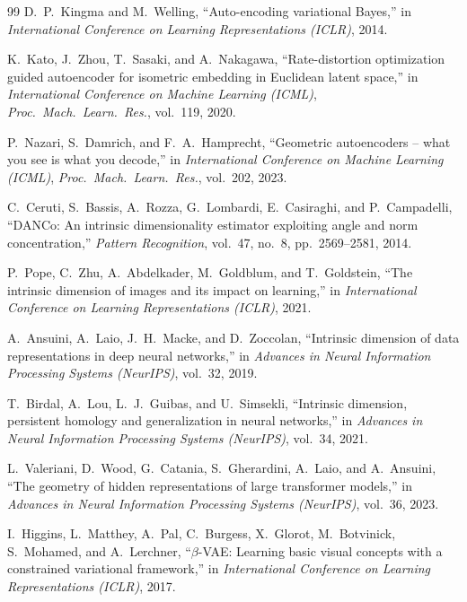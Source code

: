 \documentclass[11pt,a4paper]{jsarticle}
\begin{document}
\begin{thebibliography}{99}
D.~P.~Kingma and M.~Welling,
``Auto-encoding variational Bayes,''
in \textit{International Conference on Learning Representations (ICLR)}, 2014.

K.~Kato, J.~Zhou, T.~Sasaki, and A.~Nakagawa,
``Rate-distortion optimization guided autoencoder for isometric embedding
in Euclidean latent space,''
in \textit{International Conference on Machine Learning (ICML)},
\textit{Proc.~Mach.~Learn.~Res.}, vol.~119, 2020.

P.~Nazari, S.~Damrich, and F.~A.~Hamprecht,
``Geometric autoencoders -- what you see is what you decode,''
in \textit{International Conference on Machine Learning (ICML)},
\textit{Proc.~Mach.~Learn.~Res.}, vol.~202, 2023.

C.~Ceruti, S.~Bassis, A.~Rozza, G.~Lombardi, E.~Casiraghi, and P.~Campadelli,
``DANCo: An intrinsic dimensionality estimator exploiting angle and norm concentration,''
\textit{Pattern Recognition}, vol.~47, no.~8, pp.~2569--2581, 2014.

P.~Pope, C.~Zhu, A.~Abdelkader, M.~Goldblum, and T.~Goldstein,
``The intrinsic dimension of images and its impact on learning,''
in \textit{International Conference on Learning Representations (ICLR)}, 2021.

A.~Ansuini, A.~Laio, J.~H.~Macke, and D.~Zoccolan,
``Intrinsic dimension of data representations in deep neural networks,''
in \textit{Advances in Neural Information Processing Systems (NeurIPS)},
vol.~32, 2019.

T.~Birdal, A.~Lou, L.~J.~Guibas, and U.~Simsekli,
``Intrinsic dimension, persistent homology and generalization
in neural networks,''
in \textit{Advances in Neural Information Processing Systems (NeurIPS)},
vol.~34, 2021.

L.~Valeriani, D.~Wood, G.~Catania, S.~Gherardini, A.~Laio, and A.~Ansuini,
``The geometry of hidden representations of large transformer models,''
in \textit{Advances in Neural Information Processing Systems (NeurIPS)},
vol.~36, 2023.

I.~Higgins, L.~Matthey, A.~Pal, C.~Burgess, X.~Glorot, M.~Botvinick,
S.~Mohamed, and A.~Lerchner,
``$\beta$-VAE: Learning basic visual concepts with a constrained variational framework,''
in \textit{International Conference on Learning Representations (ICLR)}, 2017.


\end{thebibliography}
\end{document}
